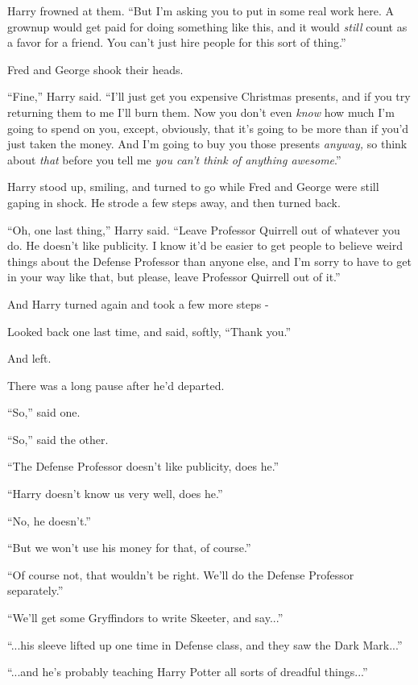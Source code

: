 Harry frowned at them. ``But I'm asking you to put in some real work here. A grownup would get paid for doing something like this, and it would \emph{still} count as a favor for a friend. You can't just hire people for this sort of thing.''

Fred and George shook their heads.

``Fine,'' Harry said. ``I'll just get you expensive Christmas presents, and if you try returning them to me I'll burn them. Now you don't even \emph{know} how much I'm going to spend on you, except, obviously, that it's going to be more than if you'd just taken the money. And I'm going to buy you those presents \emph{anyway,} so think about \emph{that} before you tell me \emph{you can't think of anything awesome}.''

Harry stood up, smiling, and turned to go while Fred and George were still gaping in shock. He strode a few steps away, and then turned back.

``Oh, one last thing,'' Harry said. ``Leave Professor Quirrell out of whatever you do. He doesn't like publicity. I know it'd be easier to get people to believe weird things about the Defense Professor than anyone else, and I'm sorry to have to get in your way like that, but please, leave Professor Quirrell out of it.''

And Harry turned again and took a few more steps -

Looked back one last time, and said, softly, ``Thank you.''

And left.

There was a long pause after he'd departed.

``So,'' said one.

``So,'' said the other.

``The Defense Professor doesn't like publicity, does he.''

``Harry doesn't know us very well, does he.''

``No, he doesn't.''

``But we won't use his money for that, of course.''

``Of course not, that wouldn't be right. We'll do the Defense Professor separately.''

``We'll get some Gryffindors to write Skeeter, and say...''

``...his sleeve lifted up one time in Defense class, and they saw the Dark Mark...''

``...and he's probably teaching Harry Potter all sorts of dreadful things...''

